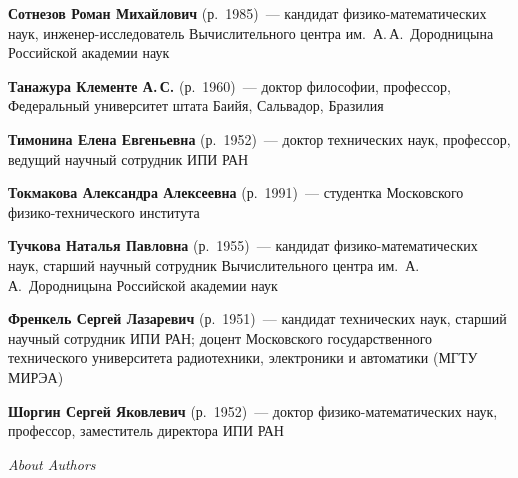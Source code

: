 \begin{multicols}{2}

\noindent
\textbf{Сотнезов Роман Михайлович} (р.\ 1985)~--- кандидат фи\-зи\-ко-математических наук,
ин\-же\-нер-ис\-сле\-до\-ва\-тель Вычислительного центра им.\ А.\,А.~Дородницына 
Российской академии наук

\vspace*{2pt}

\noindent
\textbf{Танажура  Клементе А.\,С.} (р.\ 1960)~--- доктор философии, профессор, 
Федеральный университет штата \mbox{Баийя}, Сальвадор, Бразилия

\columnbreak


\noindent
\textbf{Тимонина Елена Евгеньевна} (р.\ 1952)~---
доктор технических наук,  профессор, ведущий научный сотрудник ИПИ РАН

\vspace*{4pt}

\noindent
\textbf{Токмакова Александра Алексеевна} (р.\ 1991)~--- студентка Московского 
фи\-зи\-ко-тех\-ни\-че\-ско\-го института


\vspace*{4pt}

\noindent
\textbf{Тучкова Наталья Павловна} (р.\ 1955)~--- кандидат фи\-зи\-ко-ма\-те\-ма\-ти\-че\-ских наук, 
старший научный сотрудник Вычислительного центра им.\ А.\,А.~Дородницына Российской академии наук

\vspace*{4pt}

\noindent
\textbf{Френкель Сергей Лазаревич} (р.\ 1951)~--- кандидат технических наук,
старший научный сотрудник ИПИ РАН; доцент Московского государственного технического
университета радиотехники, электроники и автоматики (МГТУ МИРЭА)

\vspace*{4pt}

\noindent
\textbf{Шоргин Сергей Яковлевич} (р.\ 1952)~--- доктор фи\-зи\-ко-ма\-те\-ма\-ти\-че\-ских наук,
профессор, заместитель директора ИПИ РАН

\def\leftfootline{\small{\textbf{\thepage}
\hfill ИНФОРМАТИКА И ЕЁ ПРИМЕНЕНИЯ\ \ \ том~6\ \ \ выпуск~4\ \ \ 2012}
}%
 \def\rightfootline{\small{ИНФОРМАТИКА И ЕЁ ПРИМЕНЕНИЯ\ \ \ том~6\ \ \ выпуск~4\ \ \ 2012
\hfill \textbf{\thepage}}}


\end{multicols}


\vspace*{24pt}
\begin{center}\LARGE
\textit{About Authors}
\end{center}

